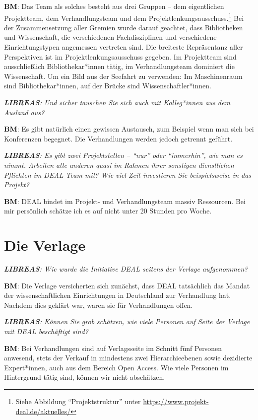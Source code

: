 \documentclass[a4paper,
fontsize=11pt,
oneside,
numbers=noperiodatend,
parskip=half-,
bibliography=totoc,
final
]{scrartcl}
\begin{document}
\textbf{BM}: Das Team als solches besteht aus drei Gruppen -- dem
eigentlichen Projektteam, dem Verhandlungsteam und dem
Projektlenkungsausschuss.\footnote{Siehe Abbildung
  \enquote{Projektstruktur} unter
  \url{https://www.projekt-deal.de/aktuelles/}} Bei der Zusammensetzung
aller Gremien wurde darauf geachtet, dass Bibliotheken und Wissenschaft,
die verschiedenen Fachdisziplinen und verschiedene Einrichtungstypen
angemessen vertreten sind. Die breiteste Repräsentanz aller Perspektiven
ist im Projektlenkungsausschuss gegeben. Im Projektteam sind
ausschließlich Bibliothekar*innen tätig, im Verhandlungsteam dominiert
die Wissenschaft. Um ein Bild aus der Seefahrt zu verwenden: Im
Maschinenraum sind Bibliothekar*innen, auf der Brücke sind
Wissenschaftler*innen.

\emph{\textbf{LIBREAS}: Und sicher tauschen Sie sich auch mit
Kolleg*innen aus dem Ausland aus?}

\textbf{BM}: Es gibt natürlich einen gewissen Austausch, zum Beispiel
wenn man sich bei Konferenzen begegnet. Die Verhandlungen werden jedoch
getrennt geführt.

\emph{\textbf{LIBREAS}: Es gibt zwei Projektstellen -- \enquote{nur}
oder \enquote{immerhin}, wie man es nimmt. Arbeiten alle anderen quasi
im Rahmen ihrer sonstigen dienstlichen Pflichten im DEAL-Team mit? Wie
viel Zeit investieren Sie beispielsweise in das Projekt?}

\textbf{BM}: DEAL bindet im Projekt- und Verhandlungsteam massiv
Ressourcen. Bei mir persönlich schätze ich es auf nicht unter 20 Stunden
pro Woche.

\hypertarget{die-verlage}{%
\section*{Die Verlage}\label{die-verlage}}

\emph{\textbf{LIBREAS}: Wie wurde die Initiative DEAL seitens der
Verlage aufgenommen?}

\textbf{BM}: Die Verlage versicherten sich zunächst, dass DEAL
tatsächlich das Mandat der wissenschaftlichen Einrichtungen in
Deutschland zur Verhandlung hat. Nachdem dies geklärt war, waren sie für
Verhandlungen offen.

\emph{\textbf{LIBREAS}: Können Sie grob schätzen, wie viele Personen auf
Seite der Verlage mit DEAL beschäftigt sind?}

\textbf{BM}: Bei Verhandlungen sind auf Verlagsseite im Schnitt fünf
Personen anwesend, stets der Verkauf in mindestens zwei Hierarchieebenen
sowie dezidierte Expert*innen, auch aus dem Bereich Open Access. Wie
viele Personen im Hintergrund tätig sind, können wir nicht abschätzen.
\end{document}
